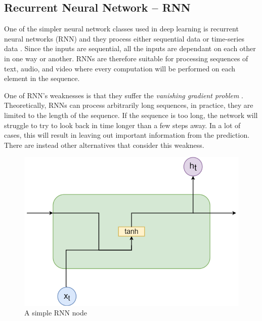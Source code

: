 \documentclass[nofilelist]{cslthse-msc}
\begin{document}
\subsection{Recurrent Neural Network -- RNN}

One of the simpler neural network classes used in deep learning is recurrent neural networks (RNN) and they process either sequential data or time-series data \citep{lipton2015critical}. Since the inputs are sequential, all the inputs are dependant on each other in one way or another. RNNs are therefore suitable for processing sequences of text, audio, and video where every computation will be performed on each element in the sequence.

One of RNN's weaknesses is that they suffer the \textit{vanishing gradient problem} \citep{hochreiter1998}. Theoretically, RNNs can process arbitrarily long sequences, in practice, they are limited to the length of the sequence. If the sequence is too long, the network will struggle to try to look back in time longer than a few steps away. In a lot of cases, this will result in leaving out important information from the prediction. There are instead other alternatives that consider this weakness. 



 
 \begin{figure}[!ht]
    \centering
    \includegraphics[scale=0.3]{msccls/explanatory_images/rnn.png}
    \caption{A simple RNN node}
    \label{fig:rnn_node}
\end{figure}
\end{document}

